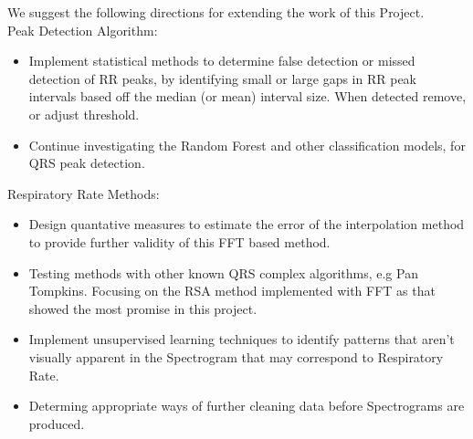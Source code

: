 We suggest the following directions for extending the work of this Project. \\

Peak Detection Algorithm:
\begin{itemize}
        \item Implement statistical methods to determine false detection or missed detection of 
        RR peaks, by identifying small or large gaps in RR peak intervals based off the median (or mean) interval size. 
        When detected remove, or adjust threshold. 
        \item Continue investigating the Random Forest and other classification models, for QRS peak detection. 
\end{itemize} 

Respiratory Rate Methods:
\begin{itemize}
        \item Design quantative measures to estimate  the error of the interpolation method to provide further validity of this FFT based 
        method.
        \item Testing methods with other known QRS complex algorithms, e.g Pan Tompkins. Focusing on the RSA method implemented with FFT as that showed the most 
        promise in this project. 
        \item Implement unsupervised learning techniques to identify patterns  that aren't visually apparent in the Spectrogram that may 
        correspond to Respiratory Rate. 
        \item Determing appropriate ways of further cleaning data before Spectrograms are produced. 
\end{itemize}

\newpage

